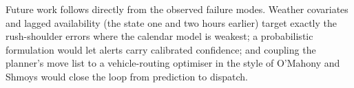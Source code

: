 \documentclass[conference]{IEEEtran}
\begin{document}
Future work follows directly from the observed failure modes. Weather covariates and lagged availability (the state one and two hours earlier) target exactly the rush-shoulder errors where the calendar model is weakest; a probabilistic formulation would let alerts carry calibrated confidence; and coupling the planner's move list to a vehicle-routing optimiser in the style of O'Mahony and Shmoys \cite{b4} would close the loop from prediction to dispatch.

\end{document}
